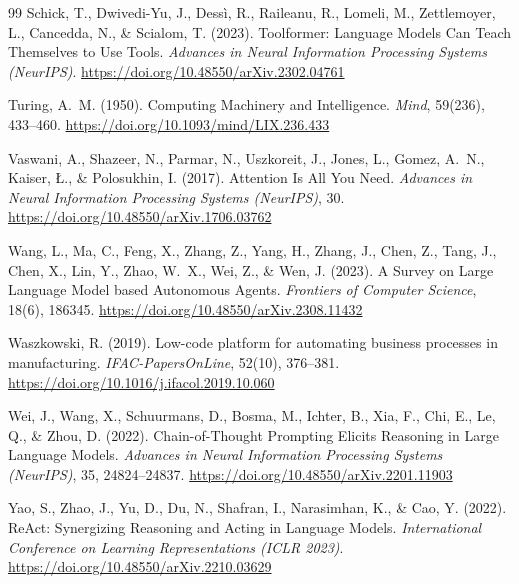 \documentclass[12pt,a4paper,oneside]{report}
\begin{document}
\begin{thebibliography}{99}
  Schick, T., Dwivedi-Yu, J., Dessì, R., Raileanu, R., Lomeli, M.,
  Zettlemoyer, L., Cancedda, N., \& Scialom, T. (2023).
  Toolformer: Language Models Can Teach Themselves to Use Tools.
  \textit{Advances in Neural Information Processing Systems (NeurIPS)}.
  \url{https://doi.org/10.48550/arXiv.2302.04761}

  Turing, A.~M. (1950).
  Computing Machinery and Intelligence.
  \textit{Mind}, 59(236), 433--460.
  \url{https://doi.org/10.1093/mind/LIX.236.433}

  Vaswani, A., Shazeer, N., Parmar, N., Uszkoreit, J., Jones, L.,
  Gomez, A.~N., Kaiser, Ł., \& Polosukhin, I. (2017).
  Attention Is All You Need.
  \textit{Advances in Neural Information Processing Systems (NeurIPS)}, 30.
  \url{https://doi.org/10.48550/arXiv.1706.03762}

  Wang, L., Ma, C., Feng, X., Zhang, Z., Yang, H., Zhang, J., Chen, Z.,
  Tang, J., Chen, X., Lin, Y., Zhao, W.~X., Wei, Z., \& Wen, J. (2023).
  A Survey on Large Language Model based Autonomous Agents.
  \textit{Frontiers of Computer Science}, 18(6), 186345.
  \url{https://doi.org/10.48550/arXiv.2308.11432}

  Waszkowski, R. (2019).
  Low-code platform for automating business processes in manufacturing.
  \textit{IFAC-PapersOnLine}, 52(10), 376--381.
  \url{https://doi.org/10.1016/j.ifacol.2019.10.060}

  Wei, J., Wang, X., Schuurmans, D., Bosma, M., Ichter, B., Xia, F.,
  Chi, E., Le, Q., \& Zhou, D. (2022).
  Chain-of-Thought Prompting Elicits Reasoning in Large Language Models.
  \textit{Advances in Neural Information Processing Systems (NeurIPS)}, 35, 24824--24837.
  \url{https://doi.org/10.48550/arXiv.2201.11903}

  Yao, S., Zhao, J., Yu, D., Du, N., Shafran, I., Narasimhan, K., \& Cao, Y. (2022).
  ReAct: Synergizing Reasoning and Acting in Language Models.
  \textit{International Conference on Learning Representations (ICLR 2023)}.
  \url{https://doi.org/10.48550/arXiv.2210.03629}

\end{thebibliography}
\end{document}
